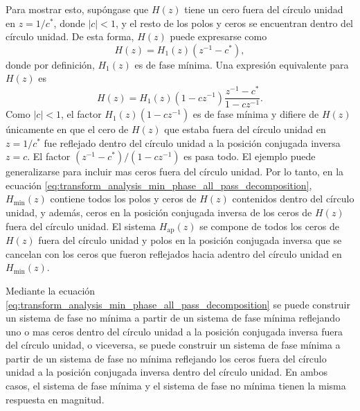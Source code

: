 \documentclass[a4paper]{report}
\begin{document}
Para mostrar esto, supóngase que \(H(z)\) tiene un cero fuera del círculo unidad en \(z=1/c^*\), donde \(|c|<1\), y el resto de los polos y ceros se encuentran dentro del círculo unidad. De esta forma, \(H(z)\) puede expresarse como
\begin{equation}\label{eq:transform_analysis_min_phase_all_pass_decomposition_tmp1}
 H(z)=H_1(z)(z^{-1}-c^*), 
\end{equation}
donde por definición, \(H_1(z)\) es de fase mínima. Una expresión equivalente para \(H(z)\) es
\begin{equation}\label{eq:transform_analysis_min_phase_all_pass_decomposition_tmp2}
 H(z)=H_1(z)(1-cz^{-1})\frac{z^{-1}-c^*}{1-cz^{-1}}. 
\end{equation}
Como \(|c|<1\), el factor \(H_1(z)(1-cz^{-1})\) es de fase mínima y difiere de \(H(z)\) únicamente en que el cero de \(H(z)\) que estaba fuera del círculo unidad en \(z=1/c^*\) fue reflejado dentro del círculo unidad a la posición conjugada inversa \(z=c\). El factor \((z^{-1}-c^*)/(1-cz^{-1})\) es pasa todo. El ejemplo puede generalizarse para incluir mas ceros fuera del círculo unidad. Por lo tanto, en la ecuación \ref{eq:transform_analysis_min_phase_all_pass_decomposition}, \(H_\textrm{min}(z)\) contiene todos los polos y ceros de \(H(z)\) contenidos dentro del círculo unidad, y además, ceros en la posición conjugada inversa de los ceros de \(H(z)\) fuera del círculo unidad. El sistema \(H_\textrm{ap}(z)\) se compone de todos los ceros de \(H(z)\) fuera del círculo unidad y polos en la posición conjugada inversa que se cancelan con los ceros que fueron reflejados hacia adentro del círculo unidad en \(H_\textrm{min}(z)\).

Mediante la ecuación \ref{eq:transform_analysis_min_phase_all_pass_decomposition} se puede construir un sistema de fase no mínima a partir de un sistema de fase mínima reflejando uno o mas ceros dentro del círculo unidad a la posición conjugada inversa fuera del círculo unidad, o viceversa, se puede construir un sistema de fase mínima a partir de un sistema de fase no mínima reflejando los ceros fuera del círculo unidad a la posición conjugada inversa dentro del círculo unidad. En ambos casos, el sistema de fase mínima y el sistema de fase no mínima tienen la misma respuesta en magnitud.
\end{document}
